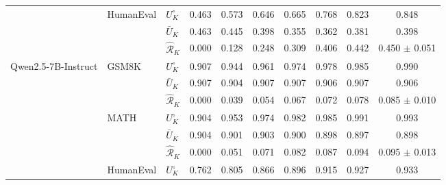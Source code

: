 \begin{table}[t]
\begin{tabular}{lll *{7}{c}}
\cmidrule(l){2-10}
 & \multirow{3}{*}{HumanEval} & $U^\circ_K$ & \cellcolor{colREU!28}0.463 & \cellcolor{colREU!34}0.573 & \cellcolor{colREU!39}0.646 & \cellcolor{colREU!40}0.665 & \cellcolor{colREU!46}0.768 & \cellcolor{colREU!49}0.823 & \cellcolor{colREU!51}0.848 \\
 &  & $\bar U_K$ & \cellcolor{colAEU!28}0.463 & \cellcolor{colAEU!27}0.445 & \cellcolor{colAEU!24}0.398 & \cellcolor{colAEU!21}0.355 & \cellcolor{colAEU!22}0.362 & \cellcolor{colAEU!23}0.381 & \cellcolor{colAEU!24}0.398 \\
 &  & $\hat{\mathcal R}_K$ & \cellcolor{colRVR!0}0.000 & \cellcolor{colRVR!8}0.128 & \cellcolor{colRVR!15}0.248 & \cellcolor{colRVR!19}0.309 & \cellcolor{colRVR!24}0.406 & \cellcolor{colRVR!27}0.442 & \cellcolor{colRVR!27}0.450 $\pm$ 0.051 \\
\midrule
\multirow{9}{*}{Qwen2.5-7B-Instruct} & \multirow{3}{*}{GSM8K} & $U^\circ_K$ & \cellcolor{colREU!54}0.907 & \cellcolor{colREU!57}0.944 & \cellcolor{colREU!58}0.961 & \cellcolor{colREU!58}0.974 & \cellcolor{colREU!59}0.978 & \cellcolor{colREU!59}0.985 & \cellcolor{colREU!59}0.990 \\
 &  & $\bar U_K$ & \cellcolor{colAEU!54}0.907 & \cellcolor{colAEU!54}0.904 & \cellcolor{colAEU!54}0.907 & \cellcolor{colAEU!54}0.907 & \cellcolor{colAEU!54}0.906 & \cellcolor{colAEU!54}0.907 & \cellcolor{colAEU!54}0.906 \\
 &  & $\hat{\mathcal R}_K$ & \cellcolor{colRVR!0}0.000 & \cellcolor{colRVR!2}0.039 & \cellcolor{colRVR!3}0.054 & \cellcolor{colRVR!4}0.067 & \cellcolor{colRVR!4}0.072 & \cellcolor{colRVR!5}0.078 & \cellcolor{colRVR!5}0.085 $\pm$ 0.010 \\
\cmidrule(l){2-10}
 & \multirow{3}{*}{MATH} & $U^\circ_K$ & \cellcolor{colREU!54}0.904 & \cellcolor{colREU!57}0.953 & \cellcolor{colREU!58}0.974 & \cellcolor{colREU!59}0.982 & \cellcolor{colREU!59}0.985 & \cellcolor{colREU!59}0.991 & \cellcolor{colREU!60}0.993 \\
 &  & $\bar U_K$ & \cellcolor{colAEU!54}0.904 & \cellcolor{colAEU!54}0.901 & \cellcolor{colAEU!54}0.903 & \cellcolor{colAEU!54}0.900 & \cellcolor{colAEU!54}0.898 & \cellcolor{colAEU!54}0.897 & \cellcolor{colAEU!54}0.898 \\
 &  & $\hat{\mathcal R}_K$ & \cellcolor{colRVR!0}0.000 & \cellcolor{colRVR!3}0.051 & \cellcolor{colRVR!4}0.071 & \cellcolor{colRVR!5}0.082 & \cellcolor{colRVR!5}0.087 & \cellcolor{colRVR!6}0.094 & \cellcolor{colRVR!6}0.095 $\pm$ 0.013 \\
\cmidrule(l){2-10}
 & \multirow{3}{*}{HumanEval} & $U^\circ_K$ & \cellcolor{colREU!46}0.762 & \cellcolor{colREU!48}0.805 & \cellcolor{colREU!52}0.866 & \cellcolor{colREU!54}0.896 & \cellcolor{colREU!55}0.915 & \cellcolor{colREU!56}0.927 & \cellcolor{colREU!56}0.933 \\

\end{tabular}
\end{table}
